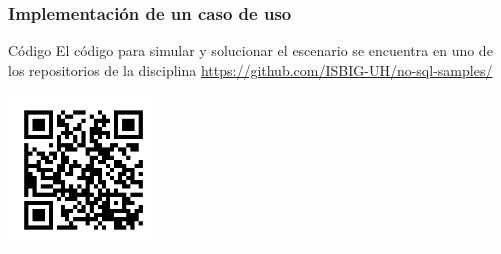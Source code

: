 \begin{frame}
    \frametitle{Implementación de un caso de uso}

    \begin{block}{Código}
        El código para simular y solucionar el escenario se encuentra en uno de los repositorios
        de la disciplina \href{https://github.com/ISBIG-UH/no-sql-samples/}{https://github.com/ISBIG-UH/no-sql-samples/}

        \begin{center}
            
            \includegraphics[width=40mm]{img/repo-qrcode.png}
        \end{center}
   
    \end{block}

\end{frame}



